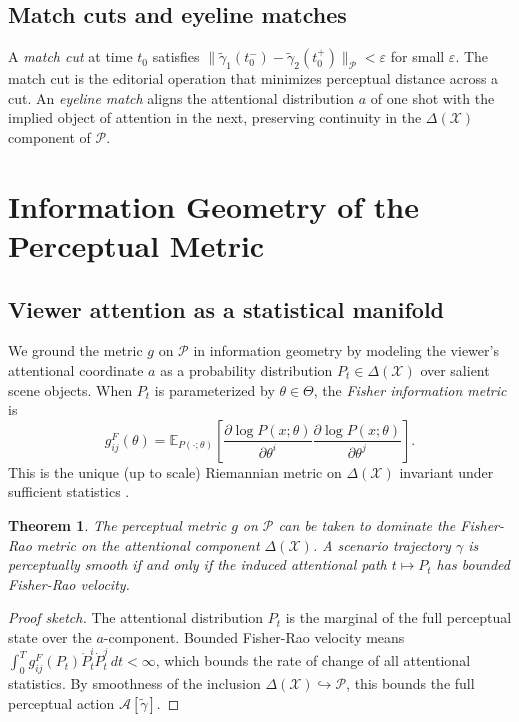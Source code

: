 \documentclass[12pt,a4paper]{article}
\theoremstyle{plain}
\newtheorem{theorem}{Theorem}[section]
\theoremstyle{definition}
\begin{document}
\subsection{Match cuts and eyeline matches}

A \emph{match cut} at time $t_0$ satisfies
$\|\tilde\gamma_1(t_0^-) - \tilde\gamma_2(t_0^+)\|_\mathcal{P} < \varepsilon$
for small $\varepsilon$. The match cut is the editorial operation that minimizes
perceptual distance across a cut. An \emph{eyeline match} aligns the
attentional distribution $a$ of one shot with the implied object of attention
in the next, preserving continuity in the $\Delta(\mathcal{X})$ component of
$\mathcal{P}$.

\section{Information Geometry of the Perceptual Metric}
\label{sec:information}

\subsection{Viewer attention as a statistical manifold}

We ground the metric $g$ on $\mathcal{P}$ in information geometry by modeling
the viewer's attentional coordinate $a$ as a probability distribution
$P_t\in\Delta(\mathcal{X})$ over salient scene objects. When $P_t$ is
parameterized by $\theta\in\Theta$, the \emph{Fisher information metric} is
\[
g_{ij}^F(\theta)
= \mathbb{E}_{P(\cdot;\theta)}\!\left[
\frac{\partial \log P(x;\theta)}{\partial\theta^i}
\frac{\partial \log P(x;\theta)}{\partial\theta^j}
\right].
\]
This is the unique (up to scale) Riemannian metric on $\Delta(\mathcal{X})$
invariant under sufficient statistics \cite{chentsov1982,amari2000}.

\begin{theorem}
\label{thm:fisher}
The perceptual metric $g$ on $\mathcal{P}$ can be taken to dominate the
Fisher-Rao metric on the attentional component $\Delta(\mathcal{X})$. A
scenario trajectory $\gamma$ is perceptually smooth if and only if the
induced attentional path $t\mapsto P_t$ has bounded Fisher-Rao velocity.
\end{theorem}

\begin{proof}[Proof sketch]
The attentional distribution $P_t$ is the marginal of the full perceptual
state over the $a$-component. Bounded Fisher-Rao velocity means
$\int_0^T g^F_{ij}(P_t)\dot P^i_t\dot P^j_t\,dt < \infty$, which bounds
the rate of change of all attentional statistics. By smoothness of the
inclusion $\Delta(\mathcal{X})\hookrightarrow\mathcal{P}$, this bounds the
full perceptual action $\mathcal{A}[\tilde\gamma]$.
\end{proof}
\end{document}
